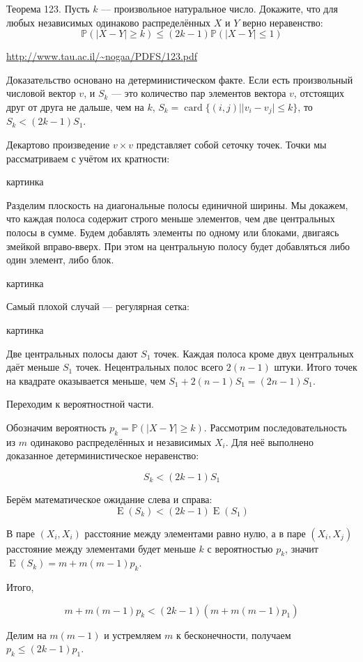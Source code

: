 \documentclass[nobib]{tufte-handout}
\theoremstyle{definition}
\newcounter{problem}
\newenvironment{problem}%
{%
\refstepcounter{problem}%
     \hypertarget{problem:{\theproblem}}{}
     \Writetofile{solution_file}{\protect\hypertarget{soln:\theproblem}{}}
     \begin{myenum}[label=\bfseries\protect\hyperlink{soln:\theproblem}{\theproblem},ref=\theproblem]
     \item%
    }%
    {%
    \end{myenum}}
\DeclareMathOperator{\card}{card}
\DeclareMathOperator{\E}{E}
\renewcommand{\P}{\mathbb{P}}
\begin{document}
\begin{problem}
Теорема 123. Пусть $k$ — произвольное натуральное число. Докажите, что для любых независимых одинаково распределённых $X$ и $Y$ верно неравенство:
\[
\P(|X-Y| \geq k) \leq (2k-1) \P(|X-Y| \leq 1)
\]


\begin{sol}
\url{http://www.tau.ac.il/~nogaa/PDFS/123.pdf}

Доказательство основано на детерминистическом факте. Если есть произвольный числовой вектор $v$, и $S_k$ — это количество пар элементов вектора $v$, отстоящих друг от друга не дальше, чем на $k$, $S_k = \card \{ (i, j) | |v_i - v_j| \leq k\}$, то $S_k < (2k-1) S_1$.

Декартово произведение $v \times v$ представляет собой сеточку точек. Точки мы рассматриваем с учётом их кратности:

картинка

Разделим плоскость на диагональные полосы единичной ширины. Мы докажем, что каждая полоса содержит строго меньше элементов, чем две центральных полосы в сумме. Будем добавлять элементы по одному или блоками, двигаясь змейкой вправо-вверх. При этом на центральную полосу будет добавляться либо один элемент, либо блок.


картинка

Самый плохой случай — регулярная сетка:

картинка

Две центральных полосы дают $S_1$ точек. Каждая полоса кроме двух центральных даёт меньше $S_1$ точек. Нецентральных полос всего $2(n-1)$ штуки. Итого точек на квадрате оказывается меньше, чем $S_1 + 2(n-1)S_1 = (2n-1) S_1$.

Переходим к вероятностной части.

Обозначим вероятность $p_k = \P(|X-Y| \geq k)$. Рассмотрим последовательность из $m$ одинаково распределённых и независимых $X_i$. Для неё выполнено доказанное детерминистическое неравенство:

\[
S_k < (2k-1) S_1
\]

Берём математическое ожидание слева и справа:
\[
\E(S_k) < (2k - 1) \E(S_1)
\]

В паре $(X_i, X_i)$ расстояние между элементами равно нулю, а в паре $(X_i, X_j)$ расстояние между элементами будет меньше $k$ с вероятностью $p_k$, значит $\E(S_k) = m + m(m-1) p_k$.

Итого,

\[
m + m(m-1) p_k < (2k-1) (m + m(m-1) p_1)
\]

Делим на $m(m-1)$ и устремляем $m$ к бесконечности, получаем $p_k \leq (2k - 1) p_1$.

\end{sol}

\end{problem}
\end{document}
